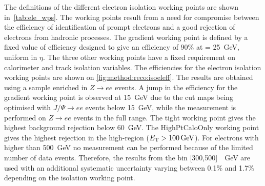 The definitions of the different electron isolation working points are shown in~\cref{tab:ele_wps}. The working points result from a need for compromise between the efficiency of identification of prompt electrons and a good rejection of electrons from hadronic processes. The gradient working point is defined by a fixed value of efficiency designed to give an efficiency of 90\% at \pt = \SI{25}{\giga\electronvolt}, uniform in $\eta$. The three other working points have a fixed requirement on calorimeter and track isolation variables. The efficiencies for the electron isolation working points are shown on \cref{fig:method:reco:isoeleff}. The results are obtained using a sample enriched in $Z\rightarrow ee$ events. A jump in the efficiency for the gradient working point is observed at \SI{15}{\giga\electronvolt} due to the cut maps being optimised with $J/\Psi \rightarrow ee$ events below \SI{15}{\giga\electronvolt}, while the measurement is performed on $Z\rightarrow ee$ events in the full range. The tight working point gives the highest background rejection below \SI{60}{\giga\electronvolt}. The HighPtCaloOnly working point gives the highest rejection in the high-\et region ($E_{\text{T}} > \SI{100}{\giga\electronvolt}$). For electrons with \et higher than \SI{500}{\giga\electronvolt} no measurement can be performed because of the limited number of data events. Therefore, the results from the \et bin [300,500]~\SI{}{\giga\electronvolt} are used with an additional systematic uncertainty varying between 0.1\% and 1.7\% depending on the isolation working point. 

\begin{table}[]
  \centering
  \caption[Definition of the electron isolation working points and isolation efficiency $\epsilon$.]{Definition of the electron isolation working points and isolation efficiency $\epsilon$.
    In the Gradient working point definition, the unit of \pt is \SI{}{\giga\electronvolt}. All working points use a cone size
    of $\Delta R = 0.2$ for calorimeter isolation and $\Delta R_{\mathrm{max}} = 0.2$ for track isolation~\cite{Aad:2019tso}.}
  \label{tab:ele_wps}
\end{table}

